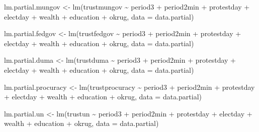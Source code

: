 \documentclass[
  letterpaper,
  DIV=11,
  numbers=noendperiod]{scrartcl}
\newenvironment{Shaded}{\begin{snugshade}}{\end{snugshade}}
\newcommand{\AttributeTok}[1]{\textcolor[rgb]{0.40,0.45,0.13}{#1}}
\newcommand{\FunctionTok}[1]{\textcolor[rgb]{0.28,0.35,0.67}{#1}}
\newcommand{\NormalTok}[1]{\textcolor[rgb]{0.00,0.23,0.31}{#1}}
\newcommand{\OtherTok}[1]{\textcolor[rgb]{0.00,0.23,0.31}{#1}}
\newcommand{\SpecialCharTok}[1]{\textcolor[rgb]{0.37,0.37,0.37}{#1}}
\begin{document}
\begin{Shaded}
\begin{Highlighting}[]
\NormalTok{lm.partial.mungov }\OtherTok{\textless{}{-}} \FunctionTok{lm}\NormalTok{(trustmungov }\SpecialCharTok{\textasciitilde{}}\NormalTok{ period3 }\SpecialCharTok{+}\NormalTok{ period2min }\SpecialCharTok{+}\NormalTok{ protestday }\SpecialCharTok{+}\NormalTok{ electday }\SpecialCharTok{+}
\NormalTok{                          wealth }\SpecialCharTok{+}\NormalTok{ education }\SpecialCharTok{+}\NormalTok{ okrug, }\AttributeTok{data =}\NormalTok{ data.partial)}

\NormalTok{lm.partial.fedgov }\OtherTok{\textless{}{-}} \FunctionTok{lm}\NormalTok{(trustfedgov }\SpecialCharTok{\textasciitilde{}}\NormalTok{ period3 }\SpecialCharTok{+}\NormalTok{ period2min }\SpecialCharTok{+}\NormalTok{ protestday }\SpecialCharTok{+}\NormalTok{ electday }\SpecialCharTok{+}
\NormalTok{                          wealth }\SpecialCharTok{+}\NormalTok{ education }\SpecialCharTok{+}\NormalTok{ okrug, }\AttributeTok{data =}\NormalTok{ data.partial)}

\NormalTok{lm.partial.duma }\OtherTok{\textless{}{-}} \FunctionTok{lm}\NormalTok{(trustduma }\SpecialCharTok{\textasciitilde{}}\NormalTok{ period3 }\SpecialCharTok{+}\NormalTok{ period2min }\SpecialCharTok{+}\NormalTok{ protestday }\SpecialCharTok{+}\NormalTok{ electday }\SpecialCharTok{+}
\NormalTok{                        wealth }\SpecialCharTok{+}\NormalTok{ education }\SpecialCharTok{+}\NormalTok{ okrug, }\AttributeTok{data =}\NormalTok{ data.partial)}

\NormalTok{lm.partial.procuracy }\OtherTok{\textless{}{-}} \FunctionTok{lm}\NormalTok{(trustprocuracy }\SpecialCharTok{\textasciitilde{}}\NormalTok{ period3 }\SpecialCharTok{+}\NormalTok{ period2min }\SpecialCharTok{+}\NormalTok{ protestday }\SpecialCharTok{+}\NormalTok{ electday }\SpecialCharTok{+}
\NormalTok{                             wealth }\SpecialCharTok{+}\NormalTok{ education }\SpecialCharTok{+}\NormalTok{ okrug, }\AttributeTok{data =}\NormalTok{ data.partial)}

\NormalTok{lm.partial.un }\OtherTok{\textless{}{-}} \FunctionTok{lm}\NormalTok{(trustun }\SpecialCharTok{\textasciitilde{}}\NormalTok{ period3 }\SpecialCharTok{+}\NormalTok{ period2min }\SpecialCharTok{+}\NormalTok{ protestday }\SpecialCharTok{+}\NormalTok{ electday }\SpecialCharTok{+}
\NormalTok{                      wealth }\SpecialCharTok{+}\NormalTok{ education }\SpecialCharTok{+}\NormalTok{ okrug, }\AttributeTok{data =}\NormalTok{ data.partial)}


\end{Highlighting}
\end{Shaded}
\end{document}
